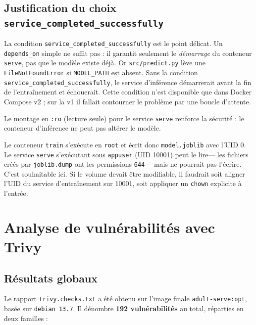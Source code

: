 \documentclass[11pt,a4paper]{report}
\begin{document}
\subsection{Justification du choix \texttt{service\_completed\_successfully}}

La condition \texttt{service\_completed\_successfully} est le point
délicat. Un \texttt{depends\_on} simple ne suffit pas : il garantit seulement le
\emph{démarrage} du conteneur \texttt{serve}, pas que le modèle existe déjà.
Or \texttt{src/predict.py} lève une \texttt{FileNotFoundError} si
\texttt{MODEL\_PATH} est absent. Sans la condition
\texttt{service\_completed\_successfully}, le service d'inférence
démarrerait avant la fin de l'entraînement et échouerait. Cette condition
n'est disponible que dans Docker Compose v2 ; sur la v1 il fallait contourner
le problème par une boucle d'attente.

Le montage en \texttt{:ro} (lecture seule) pour le service \texttt{serve}
renforce la sécurité : le conteneur d'inférence ne peut pas altérer le
modèle.

\begin{alerte}
Le conteneur \texttt{train} s'exécute en \texttt{root} et écrit donc
\texttt{model.joblib} avec l'UID 0. Le service \texttt{serve} s'exécutant
sous \texttt{appuser} (UID 10001) peut le lire--- les fichiers créés par
\texttt{joblib.dump} ont les permissions \texttt{644}--- mais ne pourrait
pas l'écrire. C'est souhaitable ici. Si le volume devait être modifiable, il
faudrait soit aligner l'UID du service d'entraînement sur 10001, soit
appliquer un \texttt{chown} explicite à l'entrée.
\end{alerte}

\section{Analyse de vulnérabilités avec Trivy}
\label{sec:trivy}

\subsection{Résultats globaux}

Le rapport \texttt{trivy.checks.txt} a été obtenu sur l'image finale
\texttt{adult-serve:opt}, basée sur \texttt{debian 13.7}. Il dénombre
\textbf{192 vulnérabilités} au total, réparties en deux familles :
\end{document}
